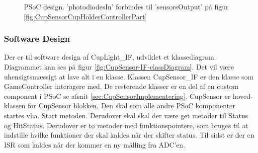 \documentclass[Rapport/Rapport_main.tex]{subfiles}
\begin{document}
\begin{figure}[H]
    \centering
    \caption{PSoC design. 'photodiodesIn' forbindes til 'sensorsOutput' på figur \ref{fig:CupSensorCupHolderControllerPart}}
    \label{fig:CupSensorPSoCDesign}
\end{figure}

\subsubsection{Software Design}
Der er til software design af CupLight\_IF, udviklet et klassediagram. Diagrammet kan ses på figur \ref{fig:CupSensor-IF-classDiagram}. Det vil være uhensigtsmæssigt at lave alt i en klasse. Klassen CupSensor\_IF er den klasse som GameController interagere med. De resterende klasser er en del af en custom component i PSoC se afsnit \ref{sec:CupSensorImplementering}. CupSensor er hoved-klassen for CupSensor blokken. Den skal som alle andre PSoC komponenter startes vha. Start metoden. Derudover skal skal der være get metoder til Status og HitStatus. Derudover er to metoder med funktionspointere, som bruges til at indstille hvilke funktioner der skal kaldes når der skifter status. Til sidst er der en ISR som kaldes når der kommer en ny målling fra ADC'en. 
 
\end{document}
